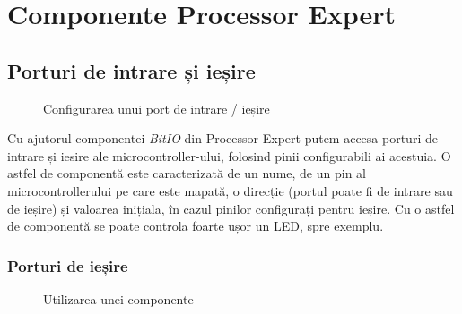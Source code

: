 \chapter{Componente Processor Expert}

\section{Porturi de intrare și ieșire}

\begin{figure}
    \vspace{-30pt}
    \vspace{-15pt}
    \caption{\label{fig:CodeWarrior-BitIO} Configurarea unui port de intrare / ieșire}
    \vspace{-10pt}
\end{figure}

Cu ajutorul componentei \textit{BitIO} din Processor Expert putem accesa porturi de intrare și iesire ale microcontroller-ului, folosind pinii configurabili ai acestuia. O astfel de componentă este caracterizată de un nume, de un pin al microcontrollerului pe care este mapată, o direcție (portul poate fi de intrare sau de ieșire) și valoarea inițiala, în cazul pinilor configurați pentru ieșire. Cu o astfel de componentă se poate controla foarte ușor un LED, spre exemplu.

\subsection{Porturi de ieșire}

\begin{figure}
    \vspace{-60pt}
    \vspace{-20pt}
    \caption{\label{fig:CodeWarrior-PExOutputIO} Utilizarea unei componente}
    \vspace{-10pt}
\end{figure}

